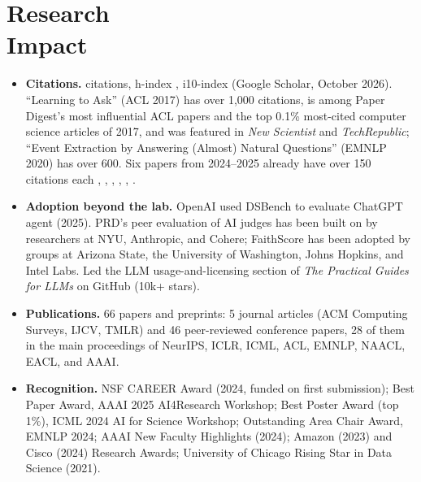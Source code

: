 \section{Research \\ Impact}

\begin{itemize}[leftmargin=10pt, label=\textbullet, itemsep=1pt, parsep=0pt, topsep=0pt]
\item \textbf{Citations.} \scholarcites{} citations, h-index \scholarhindex{}, i10-index \scholarifive{} (Google Scholar, October 2026). ``Learning to Ask'' (ACL 2017)  has over 1,000 citations, is among Paper Digest's most influential ACL papers and the top 0.1\% most-cited computer science articles of 2017, and was featured in \emph{New Scientist} and \emph{TechRepublic}; ``Event Extraction by Answering (Almost) Natural Questions'' (EMNLP 2020)  has over 600. Six papers from 2024--2025 already have over 150 citations each , , , , , .
\item \textbf{Adoption beyond the lab.} OpenAI used DSBench  to evaluate ChatGPT agent (2025). PRD's peer evaluation of AI judges  has been built on by researchers at NYU, Anthropic, and Cohere; FaithScore  has been adopted by groups at Arizona State, the University of Washington, Johns Hopkins, and Intel Labs. Led the LLM usage-and-licensing section of \emph{The Practical Guides for LLMs} on GitHub (10k+ stars).
\item \textbf{Publications.} 66 papers and preprints: 5 journal articles (ACM Computing Surveys, IJCV, TMLR) and 46 peer-reviewed conference papers, 28 of them in the main proceedings of NeurIPS, ICLR, ICML, ACL, EMNLP, NAACL, EACL, and AAAI.
\item \textbf{Recognition.} NSF CAREER Award (2024, funded on first submission); Best Paper Award, AAAI 2025 AI4Research Workshop; Best Poster Award (top 1\%), ICML 2024 AI for Science Workshop; Outstanding Area Chair Award, EMNLP 2024; AAAI New Faculty Highlights (2024); Amazon (2023) and Cisco (2024) Research Awards; University of Chicago Rising Star in Data Science (2021).

\end{itemize}
